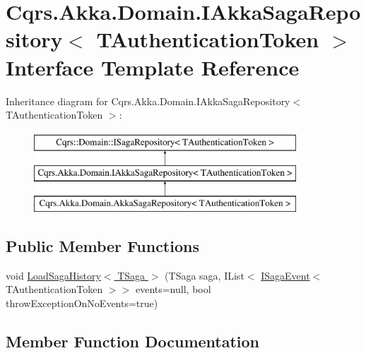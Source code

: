 \hypertarget{interfaceCqrs_1_1Akka_1_1Domain_1_1IAkkaSagaRepository}{}\section{Cqrs.\+Akka.\+Domain.\+I\+Akka\+Saga\+Repository$<$ T\+Authentication\+Token $>$ Interface Template Reference}
\label{interfaceCqrs_1_1Akka_1_1Domain_1_1IAkkaSagaRepository}
Inheritance diagram for Cqrs.\+Akka.\+Domain.\+I\+Akka\+Saga\+Repository$<$ T\+Authentication\+Token $>$\+:\begin{figure}[H]
\begin{center}
\leavevmode
\includegraphics[height=3.000000cm]{interfaceCqrs_1_1Akka_1_1Domain_1_1IAkkaSagaRepository}
\end{center}
\end{figure}
\subsection*{Public Member Functions}
\begin{DoxyCompactItemize}
\item 
void \hyperlink{interfaceCqrs_1_1Akka_1_1Domain_1_1IAkkaSagaRepository_a77233d8c2230c0a69a993faaac0101a9_a77233d8c2230c0a69a993faaac0101a9}{Load\+Saga\+History$<$ T\+Saga $>$} (T\+Saga saga, I\+List$<$ \hyperlink{interfaceCqrs_1_1Events_1_1ISagaEvent}{I\+Saga\+Event}$<$ T\+Authentication\+Token $>$$>$ events=null, bool throw\+Exception\+On\+No\+Events=true)
\end{DoxyCompactItemize}


\subsection{Member Function Documentation}
\mbox{\label{interfaceCqrs_1_1Akka_1_1Domain_1_1IAkkaSagaRepository_a77233d8c2230c0a69a993faaac0101a9_a77233d8c2230c0a69a993faaac0101a9}} 
